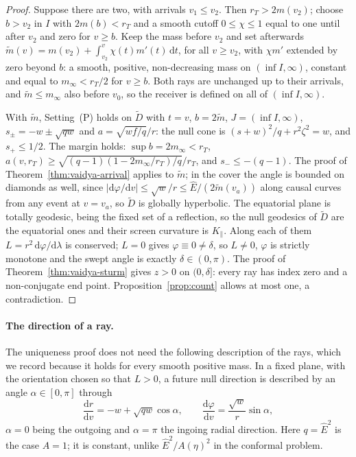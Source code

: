 \documentclass[aip,jmp,amsmath,amssymb,reprint]{revtex4-2}
\newcommand{\Ehat}{\hat E}
\newcommand{\dd}{\mathrm{d}}
\theoremstyle{plain}
\theoremstyle{definition}
\begin{document}
\begin{proof}
Suppose there are two, with arrivals $v_1\le v_2$. Then $r_T>2m(v_2)$; choose $b>v_2$ in $I$ with
$2m(b)<r_T$ and a smooth cutoff $0\le\chi\le1$ equal to one until after $v_2$ and zero for $v\ge b$.
Keep the mass before $v_2$ and set afterwards $\widetilde m(v)=m(v_2)+\int_{v_2}^v\chi(t)m'(t)\,\dd t$,
for all $v\ge v_2$, with $\chi m'$ extended by zero beyond $b$: a smooth, positive, non-decreasing mass on
$(\inf I,\infty)$, constant and equal to $m_\infty<r_T/2$ for $v\ge b$. Both rays are unchanged up to their
arrivals, and $\widetilde m\le m_\infty$ also before $v_0$, so the receiver is defined on all of $(\inf I,\infty)$.

With $\widetilde m$, Setting~(P) holds on $\widetilde D$ with $t=v$, $b=2\widetilde m$, $J=(\inf I,\infty)$,
$s_\pm=-w\pm\sqrt{qw}$ and $a=\sqrt{wf/q}/r$: the null cone is $(s+w)^2/q+r^2\zeta^2=w$, and $s_+\le1/2$. The
margin holds: $\sup b=2m_\infty<r_T$, $a(v,r_T)\ge\sqrt{(q-1)(1-2m_\infty/r_T)/q}/r_T$, and $s_-\le-(q-1)$. The
proof of Theorem~\ref{thm:vaidya-arrival} applies to $\widetilde m$; in the cover the angle is bounded on
diamonds as well, since $|\dd\varphi/\dd v|\le\sqrt w/r\le\Ehat/(2\widetilde m(v_a))$ along causal curves from any
event at $v=v_a$, so $\widetilde D$ is globally hyperbolic. The equatorial plane is totally geodesic, being the fixed set of a
reflection, so the null geodesics of $\widetilde D$ are the equatorial ones and their screen curvature
is $K_\parallel$. Along each of them $L=r^2\,\dd\varphi/\dd\lambda$ is conserved; $L=0$ gives $\varphi\equiv0\ne\delta$, so
$L\ne0$, $\varphi$ is strictly monotone and the swept angle is exactly $\delta\in(0,\pi)$. The proof of
Theorem~\ref{thm:vaidya-sturm} gives $z>0$ on $(0,\delta]$: every ray has index zero and a non-conjugate
end point. Proposition~\ref{prop:count} allows at most one, a contradiction.
\end{proof}

\paragraph{The direction of a ray.} The uniqueness proof does not need the following description
of the rays, which we record because it holds for every smooth positive mass. In a fixed plane,
with the orientation chosen so that $L>0$, a future null direction is described by an angle
$\alpha\in[0,\pi]$ through
\begin{equation}
  \frac{\dd r}{\dd v}=-w+\sqrt{qw}\cos\alpha,\qquad
  \frac{\dd\varphi}{\dd v}=\frac{\sqrt w}{r}\sin\alpha ,
  \label{eq:vaidya-alpha}
\end{equation}
$\alpha=0$ being the outgoing and $\alpha=\pi$ the ingoing radial direction. Here $q=\Ehat^2$ is the
case $A=1$; it is constant, unlike $\Ehat^2/A(\eta)^2$ in the conformal problem.
\end{document}
